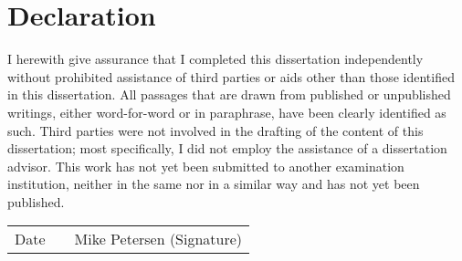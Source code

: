 \documentclass[../main.tex]{subfiles}
\begin{document}
\section*{Declaration}

I herewith give assurance that I completed this dissertation independently without prohibited assistance of third parties or aids other than those identified in this dissertation. All passages that are drawn from published or unpublished writings, either word-for-word or in paraphrase, have been clearly identified as such. Third parties were not involved in the drafting of the content of this dissertation; most specifically, I did not employ the assistance of a dissertation advisor. This work has not yet been submitted to another examination institution, neither in the same nor in a similar way and has not yet been published.

\vspace{1in}
\centering
\begin{tabular}{>{\centering\arraybackslash}p{3cm}p{4cm}>{\centering\arraybackslash}p{5cm}} 
    \cmidrule{1-1}\cmidrule{3-3}
    Date &  & Mike Petersen (Signature) 
    \end{tabular}
\clearpage
\end{document}
